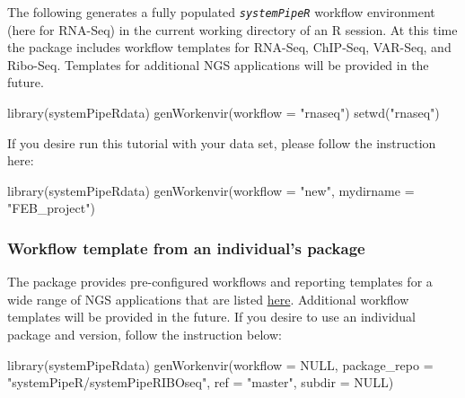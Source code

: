 \documentclass[14pt,]{article}
\newcommand{\hlnum}[1]{\textcolor[rgb]{0.816,0.125,0.439}{#1}}%
\newcommand{\hlstr}[1]{\textcolor[rgb]{0.251,0.627,0.251}{#1}}%
\newcommand{\hlstd}[1]{\textcolor[rgb]{0.251,0.251,0.251}{#1}}%
\newenvironment{Shaded}{\begin{myshaded}}{\end{myshaded}}
\newcommand{\ConstantTok}[1]{\hlnum{#1}}
\newcommand{\StringTok}[1]{\hlstr{#1}}
\newcommand{\FunctionTok}[1]{\hlstd{#1}}
\newcommand{\AttributeTok}[1]{{#1}}
\newcommand{\NormalTok}[1]{\hlstd{#1}}
\begin{document}
The following generates a fully populated \emph{\texttt{systemPipeR}} workflow environment
(here for RNA-Seq) in the current working directory of an R session. At this time
the package includes workflow templates for RNA-Seq, ChIP-Seq, VAR-Seq, and Ribo-Seq.
Templates for additional NGS applications will be provided in the future.

\begin{Shaded}
\begin{Highlighting}[]
\FunctionTok{library}\NormalTok{(systemPipeRdata)}
\FunctionTok{genWorkenvir}\NormalTok{(}\AttributeTok{workflow =} \StringTok{"rnaseq"}\NormalTok{)}
\FunctionTok{setwd}\NormalTok{(}\StringTok{"rnaseq"}\NormalTok{)}
\end{Highlighting}
\end{Shaded}

If you desire run this tutorial with your data set, please follow the instruction here:

\begin{Shaded}
\begin{Highlighting}[]
\FunctionTok{library}\NormalTok{(systemPipeRdata)}
\FunctionTok{genWorkenvir}\NormalTok{(}\AttributeTok{workflow =} \StringTok{"new"}\NormalTok{, }\AttributeTok{mydirname =} \StringTok{"FEB\_project"}\NormalTok{)}
\end{Highlighting}
\end{Shaded}

\hypertarget{workflow-template-from-an-individuals-package}{%
\subsubsection{Workflow template from an individual's package}\label{workflow-template-from-an-individuals-package}}

The package provides pre-configured workflows and reporting templates for a wide range of NGS applications that are listed \href{https://github.com/tgirke/systemPipeR/tree/devel\#workflow}{here}. Additional workflow templates will be provided in the future.
If you desire to use an individual package and version, follow the instruction below:

\begin{Shaded}
\begin{Highlighting}[]
\FunctionTok{library}\NormalTok{(systemPipeRdata)}
\FunctionTok{genWorkenvir}\NormalTok{(}\AttributeTok{workflow =} \ConstantTok{NULL}\NormalTok{, }\AttributeTok{package\_repo =} \StringTok{"systemPipeR/systemPipeRIBOseq"}\NormalTok{, }\AttributeTok{ref =} \StringTok{"master"}\NormalTok{, }
    \AttributeTok{subdir =} \ConstantTok{NULL}\NormalTok{)}
\end{Highlighting}
\end{Shaded}
\end{document}
